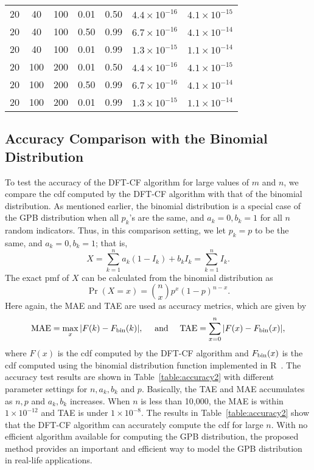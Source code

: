 \documentclass[12pt]{article}
\newcommand{\TAE}{{\rm TAE}}
\newcommand{\MAE}{{\rm MAE}}
\newcommand{\bin}{{\rm bin}}
\begin{document}
\begin{table}
\begin{tabular}{c c c c c c c}
20  &40    &100&0.01&0.50        &$4.4\times10^{-16}$&$4.1\times10^{-15}$ \\
20  &40    &100&0.50&0.99        &$6.7\times10^{-16}$&$4.1\times10^{-14}$ \\
20  &40    &100&0.01&0.99        &$1.3\times10^{-15}$&$1.1\times10^{-14}$ \\\hline
20  &100   &200&0.01&0.50        &$4.4\times10^{-16}$&$4.1\times10^{-15}$ \\
20  &100   &200&0.50&0.99        &$6.7\times10^{-16}$&$4.1\times10^{-14}$ \\
20  &100   &200&0.01&0.99        &$1.3\times10^{-15}$&$1.1\times10^{-14}$ \\
\hline\hline
\end{tabular}
\label{table:accuracy1}
\end{table}

\subsection{Accuracy Comparison with the Binomial Distribution}
To test the accuracy of the DFT-CF algorithm for large values of $m$ and $n$, we compare the cdf computed by the DFT-CF algorithm with that of the binomial distribution. As mentioned earlier, the binomial distribution is a special case of the GPB distribution when all $p_k$'s are the same, and $a_k=0, b_k=1$ for all $n$ random indicators. Thus, in this comparison setting, we let $p_k=p$ to be the same, and $ a_k=0, b_k=1$; that is,
$$X = \sum_{k=1}^n a_k(1-I_k) + b_k I_k= \sum_{k=1} ^n I_k.$$
The exact pmf of $X$ can be calculated from the binomial distribution as
$$\Pr(X=x)= {{n}\choose{x}} p^ x (1-p)^ {n-x}.$$
Here again, the MAE and TAE are used as accuracy metrics, which are given by
$$\MAE=\max_{x}| F(k)- F_{\bin} (k)|,\quad \textrm{ and } \quad \TAE=\sum_{x=0}^n | F(x)- F_{\bin} (x)|,$$
where $ F(x)$ is the cdf computed by the DFT-CF algorithm and $ F_{\bin}(x)$ is the cdf computed using the binomial distribution function implemented in R~\citeyear{R}. The accuracy test results are shown in Table~\ref{table:accuracy2} with different parameter settings for $n, a_k, b_k$ and $p$. Basically, the TAE and MAE accumulates as $n, p$ and $a_k, b_k$ increases. When $n$ is less than 10,000, the MAE is within $1\times10^{-12}$ and TAE is under $1\times10^{-8}$. The results in Table~\ref{table:accuracy2} show that the DFT-CF algorithm can accurately compute the cdf for large $n$. With no efficient algorithm available for computing the GPB distribution, the proposed method provides an important and efficient way to model the GPB distribution in real-life applications.
\end{document}
